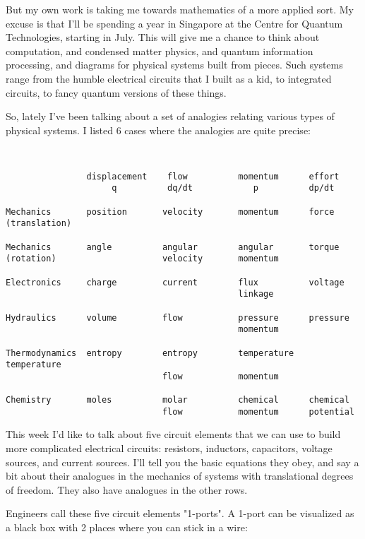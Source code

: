 But my own work is taking me towards mathematics of a more
applied sort.  My excuse is that I'll be spending a year in Singapore
at the Centre for Quantum Technologies, starting in July.  This will
give me a chance to think about computation, and condensed matter
physics, and quantum information processing, and diagrams for physical
systems built from pieces.  Such systems range from the humble
electrical circuits that I built as a kid, to integrated circuits, to
fancy quantum versions of these things.

So, lately I've been talking about a set of analogies relating various
types of physical systems.  I listed 6 cases where the analogies
are quite precise:


\begin{verbatim}


                displacement    flow          momentum      effort
                     q          dq/dt            p          dp/dt

Mechanics       position       velocity       momentum      force
(translation)

Mechanics       angle          angular        angular       torque
(rotation)                     velocity       momentum

Electronics     charge         current        flux          voltage
                                              linkage

Hydraulics      volume         flow           pressure      pressure
                                              momentum

Thermodynamics  entropy        entropy        temperature   temperature
                               flow           momentum

Chemistry       moles          molar          chemical      chemical
                               flow           momentum      potential

\end{verbatim}
    
This week I'd like to talk about five circuit elements that we can use
to build more complicated electrical circuits: resistors, inductors,
capacitors, voltage sources, and current sources.  I'll tell you the
basic equations they obey, and say a bit about their analogues in the
mechanics of systems with translational degrees of freedom.  They also
have analogues in the other rows.

Engineers call these five circuit elements "1-ports".  A
1-port can be visualized as a black box with 2 places where you can
stick in a wire:


